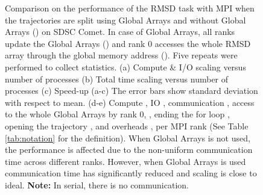 \begin{figure}[ht!]
\caption{Comparison on the performance of the RMSD task with MPI when the trajectories are split using Global Arrays and without Global Arrays () on SDSC Comet.
In case of Global Arrays, all ranks update the Global Arrays () and rank 0 accesses the whole RMSD array through the global memory address ().
Five repeats were performed to collect statistics. (a) Compute \& I/O scaling versus number of processes (b) Total time scaling versus number of processes (c) Speed-up (a-c) The error bars show standard deviation with respect to mean. (d-e) Compute \tcomp, IO \tIO, communication \tcomm, access to the whole Global Arrays by rank 0, , ending the for loop ,
  opening the trajectory , and overheads ,  per MPI rank (See Table \ref{tab:notation} for the definition). When Global Arrays is not used, the performance is affected due to the non-uniform communication time across different ranks. However, when Global Arrays is used communication time has significantly reduced and scaling is close to ideal. \textbf{Note:} In serial, there is no communication.}
\label{fig:MPIwithIO-split}
\end{figure}

